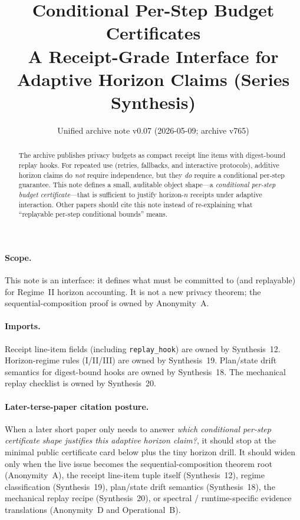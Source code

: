 \documentclass[11pt]{article}
\title{Conditional Per-Step Budget Certificates\\
\large A Receipt-Grade Interface for Adaptive Horizon Claims (Series Synthesis)}
\author{}
\date{Unified archive note v0.07 (2026-05-09; archive v765)}
\begin{document}
\maketitle

\begin{abstract}
The archive publishes privacy budgets as compact receipt line items with digest-bound replay hooks.
For repeated use (retries, fallbacks, and interactive protocols), additive horizon claims do \emph{not} require independence,
but they \emph{do} require a conditional per-step guarantee.
This note defines a small, auditable object shape---a \emph{conditional per-step budget certificate}---that is sufficient to justify
horizon-$n$ receipts under adaptive interaction.
Other papers should cite this note instead of re-explaining what ``replayable per-step conditional bounds'' means.
\end{abstract}

\paragraph{Scope.}
This note is an interface: it defines what must be committed to (and replayable) for Regime~II horizon accounting.
It is not a new privacy theorem; the sequential-composition proof is owned by Anonymity~A.\cite{series:oddsinflation}

\paragraph{Imports.}
Receipt line-item fields (including \texttt{replay\_hook}) are owned by Synthesis~12.\cite{series:receiptitems}
Horizon-regime rules (I/II/III) are owned by Synthesis~19.\cite{series:accountingrulebook}
Plan/state drift semantics for digest-bound hooks are owned by Synthesis~18.\cite{series:planstateequiv}
The mechanical replay checklist is owned by Synthesis~20.\cite{series:auditorreplay}

\paragraph{Later-terse-paper citation posture.}
When a later short paper only needs to answer \emph{which conditional per-step certificate shape justifies this adaptive horizon claim?}, it should stop at the minimal public certificate card below plus the tiny horizon drill.
It should widen only when the live issue becomes the sequential-composition theorem root (Anonymity~A), the receipt line-item tuple itself (Synthesis~12), regime classification (Synthesis~19), plan/state drift semantics (Synthesis~18), the mechanical replay recipe (Synthesis~20), or spectral / runtime-specific evidence translations (Anonymity~D and Operational~B).\cite{series:oddsinflation,series:receiptitems,series:accountingrulebook,series:planstateequiv,series:auditorreplay,series:spectral2budget,series:operationalB}
\end{document}
